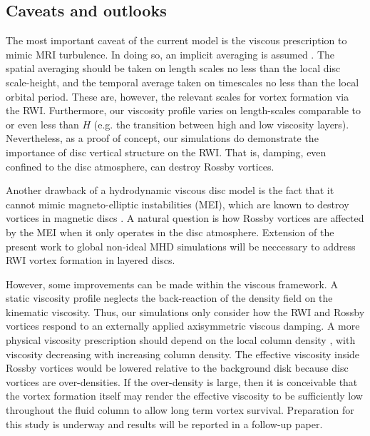 \subsection{Caveats and outlooks}\label{caveats}

The most important caveat of the current model is the viscous
prescription to mimic MRI turbulence. In doing so, an implicit
averaging is assumed \citep{balbus99}. The spatial averaging should be
taken on length scales no less than the local disc scale-height, and
the temporal average taken on timescales no less than the local
orbital period. These are, however, the relevant scales for vortex
formation via the RWI. Furthermore, our viscosity profile varies on
length-scales comparable to or even less than $H$ (e.g. the transition
between high and low viscosity layers). Nevertheless, as a proof of
concept, our simulations do demonstrate %
the importance of disc vertical structure on the RWI. That is, damping,
even confined to the disc atmosphere, can destroy Rossby vortices. 

Another drawback of a hydrodynamic viscous disc model is the
fact that it cannot mimic magneto-elliptic instabilities (MEI), which
are known to destroy vortices in magnetic discs
\citep{lyra11,mizerski12}. A natural question is how 
Rossby vortices are affected by the MEI when it only operates in
the disc atmosphere. Extension of the present work to global non-ideal
MHD simulations will be neccessary to address RWI vortex formation in
layered discs.   

However, some improvements can be made within the viscous
framework. A static viscosity profile neglects the
back-reaction of the density field on the kinematic viscosity. Thus,
our simulations only consider how the RWI and Rossby vortices
respond to an externally applied axisymmetric viscous damping. A more
physical viscosity prescription should depend on the local column density
\citep{fleming03}, with viscosity decreasing with increasing column
density. The effective viscosity inside Rossby vortices would be
lowered relative to the background disk because disc vortices are
over-densities. If the over-density is large, then it is
conceivable that the vortex formation itself may render the effective
viscosity to be sufficiently low throughout the fluid column to allow
long term vortex survival.    
Preparation for this study is underway and results will be reported in
a follow-up paper. 
